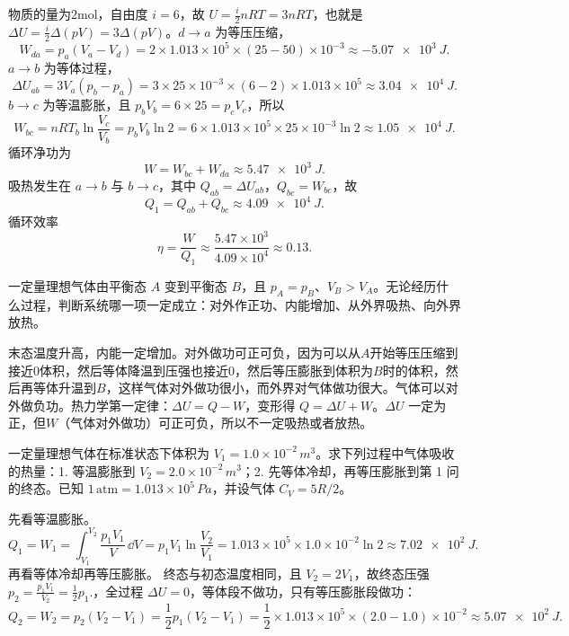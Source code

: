 \documentclass[lang=cn,11pt]{elegantbook}
\begin{document}
\begin{solution}
物质的量为$2$mol，自由度 \(i=6\)，故 \(U=\frac{i}{2}nRT=3nRT\)，也就是 \(\Delta U=\frac{i}{2}\Delta(pV)=3\Delta(pV)\)。\(d\to a\) 为等压压缩，
\[
W_{da}=p_a(V_a-V_d)
=2\times1.013\times10^5\times(25-50)\times10^{-3}
\approx -\SI{5.07e3}{J}.
\]
\(a\to b\) 为等体过程，
\[
\Delta U_{ab}=3V_a(p_b-p_a)
=3\times25\times10^{-3}\times(6-2)\times1.013\times10^5
\approx \SI{3.04e4}{J}.
\]
\(b\to c\) 为等温膨胀，且 \(p_bV_b=6\times25=p_cV_c\)，所以
 \[W_{bc}=nRT_b\ln\frac{V_c}{V_b} =p_bV_b\ln2 =6\times1.013\times10^5\times25\times10^{-3}\ln2 \approx \SI{1.05e4}{J}.\]
循环净功为
 \[W=W_{bc}+W_{da}\approx \SI{5.47e3}{J}.\]
吸热发生在 \(a\to b\) 与 \(b\to c\)，其中 \(Q_{ab}=\Delta U_{ab}\)，\(Q_{bc}=W_{bc}\)，故
 \[Q_1=Q_{ab}+Q_{bc} \approx \SI{4.09e4}{J}.\]
循环效率
 \[\eta=\frac{W}{Q_1} \approx \frac{5.47\times10^3}{4.09\times10^4} \approx 0.13.\]
\end{solution}

\begin{exercise}
一定量理想气体由平衡态 \(A\) 变到平衡态 \(B\)，且 \(p_A=p_B\)、\(V_B>V_A\)。无论经历什么过程，判断系统哪一项一定成立：对外作正功、内能增加、从外界吸热、向外界放热。
\end{exercise}

\begin{solution}
末态温度升高，内能一定增加。对外做功可正可负，因为可以从$A$开始等压压缩到接近0体积，然后等体降温到压强也接近0，然后等压膨胀到体积为$B$时的体积，然后再等体升温到$B$，这样气体对外做功很小，而外界对气体做功很大。气体可以对外做负功。热力学第一定律：\(\Delta U = Q - W\)，变形得 \(Q=\Delta U + W\)。\(\Delta U\) 一定为正，但$W$（气体对外做功）可正可负，所以不一定吸热或者放热。
\end{solution}

\begin{exercise}[标准状态理想气体两条路径到同一终态的吸热]
一定量理想气体在标准状态下体积为 \(V_1=1.0\times10^{-2}\,\si{m^3}\)。求下列过程中气体吸收的热量：1. 等温膨胀到 \(V_2=2.0\times10^{-2}\,\si{m^3}\)；2. 先等体冷却，再等压膨胀到第 1 问的终态。已知 \(1\,\mathrm{atm}=1.013\times10^5\,\si{Pa}\)，并设气体 \(C_V=5R/2\)。
\end{exercise}

\begin{solution}
先看等温膨胀。
 \[Q_1=W_1=\int_{V_1}^{V_2}\frac{p_1V_1}{V}\,\dd V =p_1V_1\ln\frac{V_2}{V_1}=1.013\times10^5\times1.0\times10^{-2}\ln2 \approx \SI{7.02e2}{J}.\]
再看等体冷却再等压膨胀。 终态与初态温度相同，且 \(V_2=2V_1\)，故终态压强\(p_2=\frac{p_1V_1}{V_2}=\frac12p_1.\)，全过程 \(\Delta U=0\)，等体段不做功，只有等压膨胀段做功：
 \[Q_2=W_2=p_2(V_2-V_1) =\frac12p_1(V_2-V_1)=\frac12\times1.013\times10^5\times(2.0-1.0)\times10^{-2}
\approx \SI{5.07e2}{J}.\]
\end{solution}
\end{document}
